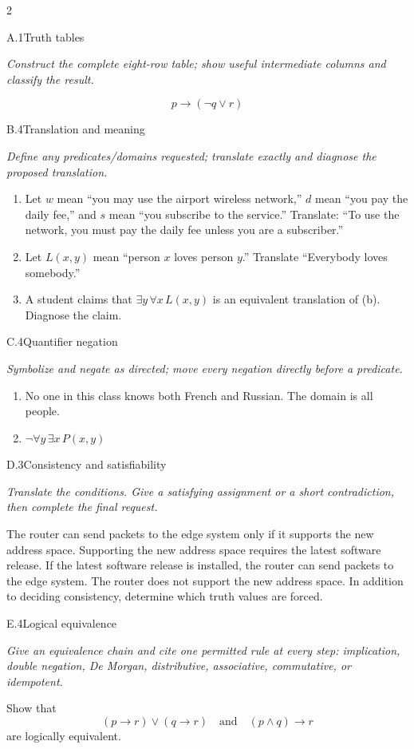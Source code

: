 \documentclass[9pt]{extarticle}
\begin{document}
\begin{multicols}{2}
\begin{CoreProblem}{A.1}{Truth tables}
{\scriptsize\textit{Construct the complete eight-row table; show useful intermediate columns and classify the result.}\par}
\[
  p\to(\neg q\lor r)
\]
\end{CoreProblem}
\begin{CoreProblem}{B.4}{Translation and meaning}
{\scriptsize\textit{Define any predicates/domains requested; translate exactly and diagnose the proposed translation.}\par}
\begin{enumerate}[label=(\alph*)]
  \item Let $w$ mean ``you may use the airport wireless network,'' $d$ mean
        ``you pay the daily fee,'' and $s$ mean ``you subscribe to the
        service.'' Translate: ``To use the network, you must pay the daily fee
        unless you are a subscriber.''
  \item Let $L(x,y)$ mean ``person $x$ loves person $y$.'' Translate
        ``Everybody loves somebody.''
  \item A student claims that $\exists y\,\forall x\,L(x,y)$ is an equivalent
        translation of (b). Diagnose the claim.
\end{enumerate}
\end{CoreProblem}
\begin{CoreProblem}{C.4}{Quantifier negation}
{\scriptsize\textit{Symbolize and negate as directed; move every negation directly before a predicate.}\par}
\begin{enumerate}[label=(\alph*)]
  \item No one in this class knows both French and Russian. The domain is all
        people.
  \item $\neg\forall y\,\exists x\,P(x,y)$
\end{enumerate}
\end{CoreProblem}
\columnbreak
\begin{CoreProblem}{D.3}{Consistency and satisfiability}
{\scriptsize\textit{Translate the conditions. Give a satisfying assignment or a short contradiction, then complete the final request.}\par}
The router can send packets to the edge system only if it supports the new
address space. Supporting the new address space requires the latest software
release. If the latest software release is installed, the router can send
packets to the edge system. The router does not support the new address space.
In addition to deciding consistency, determine which truth values are forced.
\end{CoreProblem}
\begin{CoreProblem}{E.4}{Logical equivalence}
{\scriptsize\textit{Give an equivalence chain and cite one permitted rule at every step: implication, double negation, De Morgan, distributive, associative, commutative, or idempotent.}\par}
Show that
\[
  (p\to r)\lor(q\to r)
  \quad\text{and}\quad
  (p\land q)\to r
\]
are logically equivalent.
\end{CoreProblem}
\end{multicols}
\end{document}
